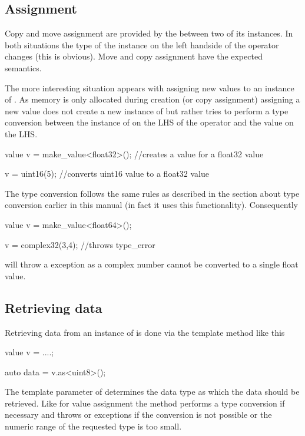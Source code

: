 \subsection{Assignment}

Copy and move assignment are provided by the  between two of its
instances. In both situations the type of the  instance on the 
left handside of the operator changes (this is obvious). 
Move and copy assignment have the expected semantics. 

The more interesting situation appears with assigning new values to an instance
of . As memory is only allocated during creation (or copy
assignment) assigning a new value does not create a new instance of
 but rather tries to perform a type conversion between the 
instance of  on the LHS of the operator and the value on the LHS. 
\begin{cppcode}
value v = make_value<float32>(); //creates a value for a float32 value

v = uint16(5); //converts uint16 value to a float32 value
\end{cppcode}
The type conversion follows the same rules as described in the section about 
type conversion earlier in this manual (in fact it uses this functionality). 
Consequently 
\begin{cppcode}
value v = make_value<float64>(); 

v = complex32(3,4); //throws type_error 
\end{cppcode}
will throw a  exception as a complex number cannot be 
converted to a single float value.

\subsection{Retrieving data}

Retrieving data from an instance of  is done via the  
template method like this
\begin{cppcode}
value v = ....;

auto data = v.as<uint8>();
\end{cppcode}
The template parameter of  determines the data type as which the data
should be retrieved. Like for value assignment the method performs a type
conversion if necessary and throws  or  
exceptions if the conversion is not possible or the numeric range of the
requested type is too small.


